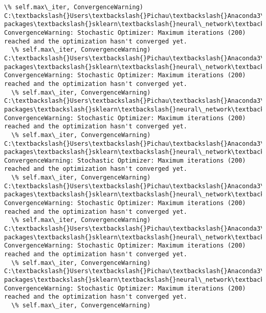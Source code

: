 \documentclass[11pt]{article}
\begin{document}
\begin{Verbatim}[commandchars=\\\{\}]
  \% self.max\_iter, ConvergenceWarning)
C:\textbackslash{}Users\textbackslash{}Pichau\textbackslash{}Anaconda3\textbackslash{}lib\textbackslash{}site-packages\textbackslash{}sklearn\textbackslash{}neural\_network\textbackslash{}multilayer\_perceptron.py:564: ConvergenceWarning: Stochastic Optimizer: Maximum iterations (200) reached and the optimization hasn't converged yet.
  \% self.max\_iter, ConvergenceWarning)
C:\textbackslash{}Users\textbackslash{}Pichau\textbackslash{}Anaconda3\textbackslash{}lib\textbackslash{}site-packages\textbackslash{}sklearn\textbackslash{}neural\_network\textbackslash{}multilayer\_perceptron.py:564: ConvergenceWarning: Stochastic Optimizer: Maximum iterations (200) reached and the optimization hasn't converged yet.
  \% self.max\_iter, ConvergenceWarning)
C:\textbackslash{}Users\textbackslash{}Pichau\textbackslash{}Anaconda3\textbackslash{}lib\textbackslash{}site-packages\textbackslash{}sklearn\textbackslash{}neural\_network\textbackslash{}multilayer\_perceptron.py:564: ConvergenceWarning: Stochastic Optimizer: Maximum iterations (200) reached and the optimization hasn't converged yet.
  \% self.max\_iter, ConvergenceWarning)
C:\textbackslash{}Users\textbackslash{}Pichau\textbackslash{}Anaconda3\textbackslash{}lib\textbackslash{}site-packages\textbackslash{}sklearn\textbackslash{}neural\_network\textbackslash{}multilayer\_perceptron.py:564: ConvergenceWarning: Stochastic Optimizer: Maximum iterations (200) reached and the optimization hasn't converged yet.
  \% self.max\_iter, ConvergenceWarning)
C:\textbackslash{}Users\textbackslash{}Pichau\textbackslash{}Anaconda3\textbackslash{}lib\textbackslash{}site-packages\textbackslash{}sklearn\textbackslash{}neural\_network\textbackslash{}multilayer\_perceptron.py:564: ConvergenceWarning: Stochastic Optimizer: Maximum iterations (200) reached and the optimization hasn't converged yet.
  \% self.max\_iter, ConvergenceWarning)
C:\textbackslash{}Users\textbackslash{}Pichau\textbackslash{}Anaconda3\textbackslash{}lib\textbackslash{}site-packages\textbackslash{}sklearn\textbackslash{}neural\_network\textbackslash{}multilayer\_perceptron.py:564: ConvergenceWarning: Stochastic Optimizer: Maximum iterations (200) reached and the optimization hasn't converged yet.
  \% self.max\_iter, ConvergenceWarning)
C:\textbackslash{}Users\textbackslash{}Pichau\textbackslash{}Anaconda3\textbackslash{}lib\textbackslash{}site-packages\textbackslash{}sklearn\textbackslash{}neural\_network\textbackslash{}multilayer\_perceptron.py:564: ConvergenceWarning: Stochastic Optimizer: Maximum iterations (200) reached and the optimization hasn't converged yet.
  \% self.max\_iter, ConvergenceWarning)

    \end{Verbatim}
\end{document}
